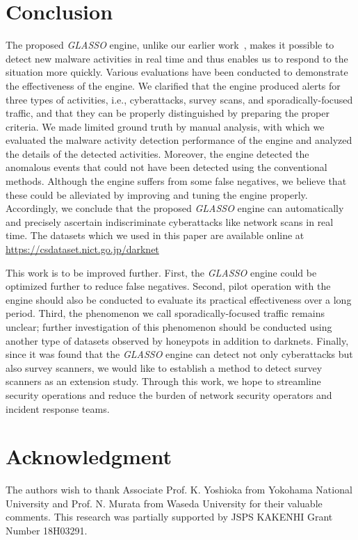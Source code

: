 \documentclass[conference]{IEEEtran}
\begin{document}
\section{Conclusion}
The proposed \textit{GLASSO} engine, unlike our earlier work~\cite{Han}, makes it possible to detect new malware activities in real time and thus enables us to respond to the situation more quickly.
Various evaluations have been conducted to demonstrate the effectiveness of the engine.
We clarified that the engine produced alerts for three types of activities, i.e., cyberattacks, survey scans, and sporadically-focused traffic, and that they can be properly distinguished by preparing the proper criteria.
We made limited ground truth by manual analysis, with which we evaluated the malware activity detection performance of the engine and analyzed the details of the detected activities.
Moreover, the engine detected the anomalous events that could not have been detected using the conventional methods.
Although the engine suffers from some false negatives, we believe that these could be alleviated by improving and tuning the engine properly.
Accordingly, we conclude that the proposed \textit{GLASSO} engine can automatically and precisely ascertain indiscriminate cyberattacks like network scans in real time.
The datasets which we used in this paper are available online at \url{https://csdataset.nict.go.jp/darknet}

This work is to be improved further.
First, the \textit{GLASSO} engine could be optimized further to reduce false negatives.
Second, pilot operation with the engine should also be conducted to evaluate its practical effectiveness over a long period.
Third, the phenomenon we call sporadically-focused traffic remains unclear; further investigation of this phenomenon should be conducted using another type of datasets observed by honeypots in addition to darknets.
Finally, since it was found that the \textit{GLASSO} engine can detect not only cyberattacks but also survey scanners, we would like to establish a method to detect survey scanners as an extension study.
Through this work, we hope to streamline security operations and reduce the burden of network security operators and incident response teams.




\section*{Acknowledgment}
The authors wish to thank Associate Prof. K. Yoshioka from Yokohama National University and  Prof. N. Murata from Waseda University for their valuable comments.
This research was partially supported by JSPS KAKENHI Grant Number 18H03291.
\end{document}
